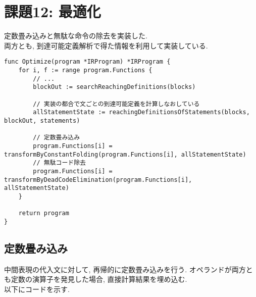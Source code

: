\documentclass[a4j]{jarticle}
\begin{document}
\section{課題12: 最適化}
定数畳み込みと無駄な命令の除去を実装した. \\

両方とも, 到達可能定義解析で得た情報を利用して実装している.

\begin{verbatim}
func Optimize(program *IRProgram) *IRProgram {
    for i, f := range program.Functions {
        // ...
        blockOut := searchReachingDefinitions(blocks)

        // 実装の都合で文ごとの到達可能定義を計算しなおしている
        allStatementState := reachingDefinitionsOfStatements(blocks, blockOut, statements)

        // 定数畳み込み
        program.Functions[i] = transformByConstantFolding(program.Functions[i], allStatementState)
        // 無駄コード除去
        program.Functions[i] = transformByDeadCodeElimination(program.Functions[i], allStatementState)
    }

    return program
}
\end{verbatim}

\subsection{定数畳み込み}
中間表現の代入文に対して, 再帰的に定数畳み込みを行う. オペランドが両方とも定数の演算子を発見した場合, 直接計算結果を埋め込む. \\

以下にコードを示す.
\end{document}
